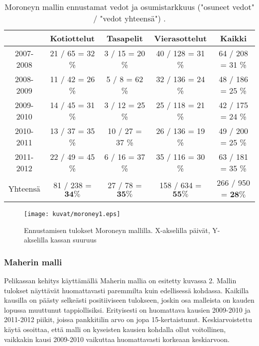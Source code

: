 \documentclass[a4paper,finnish,titlepage,12pt]{article}
\begin{document}
\begin{table}
\caption{Moroneyn mallin ennustamat vedot ja osumistarkkuus ("osuneet vedot" / "vedot yhteensä") .}
\begin{center}
\begin{tabular}{c|c||c||c||c}
	& Kotiottelut & Tasapelit & Vierasottelut & Kaikki \\
	\hline
	2007-2008 & 21 / 65 = 32 \% & 3 / 15 = 20 \% & 40 / 128 = 31 \% & 64 / 208 = 31 \% \\ 
	2008-2009 & 11 / 42 = 26 \% & 5 / 8 = 62 \% & 32 / 136 = 24 \% & 48 / 186 = 25 \% \\ 	
	2009-2010 & 14 / 45 = 31 \% & 3 / 12 = 25 \% & 25 / 118 = 21 \% & 42 / 175 = 24 \% \\ 
	2010-2011 & 13 / 37 = 35 \% & 10 / 27 = 37 \% & 26 / 136 = 19 \% & 49 / 200 = 25 \% \\ 
	2011-2012 & 22 / 49 = 45 \% & 6 / 16 = 37 \% & 35 / 116 = 30 \% & 63 / 181 = 35 \% \\ 
	\hline
	Yhteensä & 81 / 238 = $\mathbf{34 \%}$ & 27 / 78 = $\mathbf{35 \%}$ & 158 / 634 = $\mathbf{55 \%}$ & 266 / 950 = $\mathbf{28 \%}$   \\
	\hline
\end{tabular}
\end{center}
\end{table}


\begin{center}
\begin{figure}[h!]
\texttt{[image: kuvat/moroney1.eps]}
\caption{Ennustamisen tulokset Moroneyn mallilla. X-akselilla päivät, Y-akselilla kassan suuruus}
\end{figure}
\end{center}


\subsubsection{Maherin malli}

Pelikassan kehitys käyttämällä Maherin mallia on esitetty kuvassa 2.
Mallin tulokset näyttävät huomattavasti paremmilta kuin edellisessä kohdassa.
Kaikilla kausilla on päästy selkeästi positiiviseen tulokseen, joskin osa malleista on kauden lopussa muuttunut tappiollisiksi.
Erityisesti on huomattava kausien 2009-2010 ja 2011-2012 piikit, joissa pankkitilin arvo on jopa 15-kertaistunut.
Keskiarvoistettu käytä osoittaa, että malli on kyseisten kausien kohdalla ollut voitollinen, vaikkakin kausi 2009-2010 vaikuttaa huomattavasti korkeaan keskiarvoon.
\end{document}
